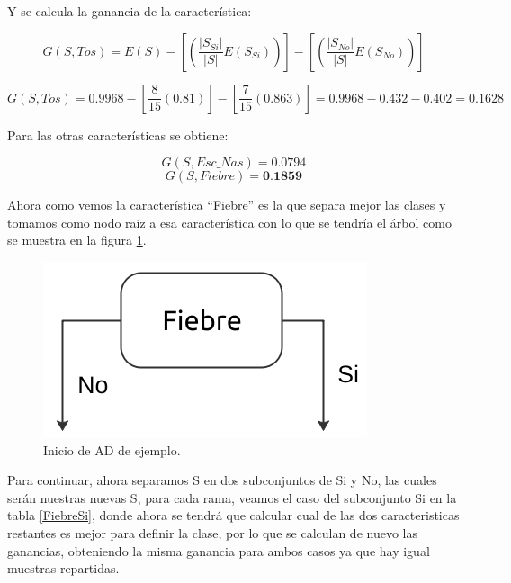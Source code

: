 \documentclass[twoside,spanish,ESP,MSc]{plantillaLabUPV}
\theoremstyle{definition}
\begin{document}
Y se calcula la ganancia de la característica:

$$G(S,Tos) = E(S) - \left[\left(\frac{|S_{Si}|}{|S|} E(S_{Si})\right) \right] - \left[\left(\frac{|S_{No}|}{|S|} E(S_{No})\right) \right] $$

$$G(S,Tos) = 0.9968 - \left[\frac{8}{15} (0.81) \right] - \left[\frac{7}{15} (0.863) \right] = 0.9968 - 0.432 - 0.402 = 0.1628$$

Para las otras características se obtiene:

$$G(S,Esc\_Nas) = 0.0794$$
$$G(S,Fiebre) = \textbf{0.1859}$$

Ahora como vemos la característica ``Fiebre'' es la que separa mejor las clases y tomamos como nodo raíz a esa característica con lo que se tendría el árbol como se muestra en la figura \ref{arbolito}.

\begin{figure}[!tbh] 
	\centering 
	\includegraphics[scale=.4]{edrawimas/arbolito} 
	\caption{Inicio de AD de ejemplo.} 
	\label{arbolito} 
\end{figure}

Para continuar, ahora separamos S en dos subconjuntos de Si y No, las cuales serán nuestras nuevas S, para cada rama, veamos el caso del subconjunto Si en la tabla \ref{FiebreSi}, donde ahora se tendrá que calcular cual de las dos caracteristicas restantes es mejor para definir la clase, por lo que se calculan de nuevo las ganancias, obteniendo la misma ganancia para ambos casos ya que hay igual muestras repartidas.
\end{document}
